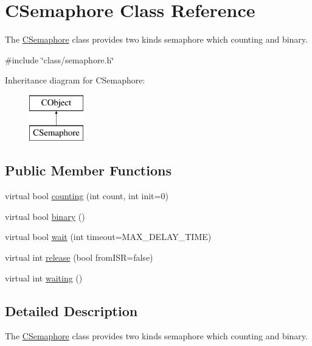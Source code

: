 \hypertarget{class_c_semaphore}{\section{C\-Semaphore Class Reference}
\label{class_c_semaphore}
}


The \hyperlink{class_c_semaphore}{C\-Semaphore} class provides two kinds semaphore which counting and binary.  




{\ttfamily \#include \char`\"{}class/semaphore.\-h\char`\"{}}

Inheritance diagram for C\-Semaphore\-:\begin{figure}[H]
\begin{center}
\leavevmode
\includegraphics[height=2.000000cm]{d0/d06/class_c_semaphore}
\end{center}
\end{figure}
\subsection*{Public Member Functions}
\begin{DoxyCompactItemize}
\item 
virtual bool \hyperlink{class_c_semaphore_af4e913cd2861355f8be2211ae21753ba}{counting} (int count, int init=0)
\item 
virtual bool \hyperlink{class_c_semaphore_a0fc078dfd286cb3321c6cbaf7bcbb7b2}{binary} ()
\item 
virtual bool \hyperlink{class_c_semaphore_abad6f22e40a0d911e38ade968f4d801a}{wait} (int timeout=M\-A\-X\-\_\-\-D\-E\-L\-A\-Y\-\_\-\-T\-I\-M\-E)
\item 
virtual int \hyperlink{class_c_semaphore_aa1a25ff1be26f8dfdd0f008aeabec8b1}{release} (bool from\-I\-S\-R=false)
\item 
virtual int \hyperlink{class_c_semaphore_a2302ceb8f2f9e1bef3381f457589177d}{waiting} ()
\end{DoxyCompactItemize}


\subsection{Detailed Description}
The \hyperlink{class_c_semaphore}{C\-Semaphore} class provides two kinds semaphore which counting and binary. 

